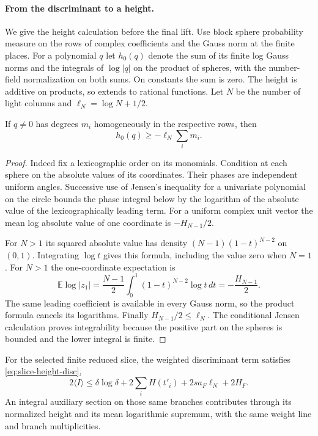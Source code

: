 \paragraph{From the discriminant to a height.}
\hypertarget{source-slice-heights}{}
We give the height calculation before the final lift. Use block
sphere probability measure on the rows of complex coefficients
and the Gauss norm at the finite places. For a polynomial \(q\)
let \(h_0(q)\) denote the sum of its finite log Gauss norms and
the integrals of \(\log|q|\) on the product of spheres, with the
number-field normalization on both sums. On constants the sum
is zero. The height is additive on products, so extends to
rational functions. Let \(N\) be the number of light columns
and \(\ell_N=\log N+1/2\).

\begin{lemma}
\label{lem:coefficient-sphere-height}
If \(q\ne0\) has degrees \(m_i\)
homogeneously in the respective rows, then
\begin{equation}\label{eq:slice-sphere-lower}
 h_0(q)\ge-\ell_N\sum_i m_i .
\end{equation}
\end{lemma}

\begin{proof}
Indeed fix a lexicographic order on its monomials. Condition
at each sphere on the absolute values of its coordinates.
Their phases are independent uniform angles. Successive use
of Jensen's inequality for a univariate polynomial on the
circle bounds the phase integral below by the logarithm of
the absolute value of the lexicographically leading term.
For a uniform complex unit vector the mean log absolute
value of one coordinate is \(-H_{N-1}/2\).

For \(N>1\)
its squared absolute value has density
\((N-1)(1-t)^{N-2}\) on \((0,1)\). Integrating \(\log t\)
gives this formula, including the value zero when \(N=1\).
For \(N>1\) the one-coordinate expectation is
\[
  \mathbb E\log|z_1|=\frac{N-1}{2}\int_0^1(1-t)^{N-2}\log t\,dt=-\frac{H_{N-1}}2 .
\]
The same leading coefficient is available in every Gauss
norm, so the product formula cancels its logarithms.
Finally \(H_{N-1}/2\le\ell_N\). The conditional Jensen
calculation proves integrability because the positive part on
the spheres is bounded and the lower integral is finite.

\end{proof}

\begin{proposition}
\label{prop:slice-height-discriminant}
For the selected finite reduced slice, the weighted discriminant term satisfies \eqref{eq:slice-height-disc},
\[
 2\langle I\rangle\le\delta\log\delta+2\sum_i H(t'_i)+2s a_F\ell_N+2H_F.
\]
 An integral auxiliary section
on those same branches contributes through its normalized height and
its mean logarithmic supremum, with the same weight line and branch
multiplicities.
\end{proposition}

